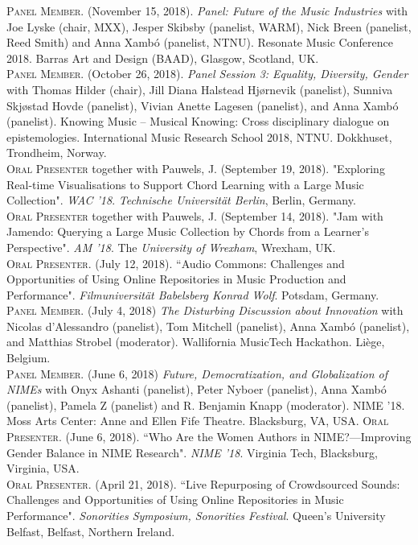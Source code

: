 \documentclass[10pt, a4paper]{article}
\newcommand{\years}[1]{\marginnote{\scriptsize #1}}
\begin{document}
{\years{2018i}\textsc{Panel Member}. (November 15, 2018). \emph{Panel: Future of the Music Industries} with Joe Lyske (chair, MXX), Jesper Skibsby (panelist, WARM), Nick Breen (panelist, Reed Smith) and Anna Xambó (panelist, NTNU). Resonate Music Conference 2018. Barras Art and Design (BAAD), Glasgow, Scotland, UK.\\
\years{2018h}\textsc{Panel Member}. (October 26, 2018). \emph{Panel Session 3: Equality, Diversity, Gender} with Thomas Hilder (chair), Jill Diana Halstead Hjørnevik (panelist), Sunniva Skjøstad Hovde (panelist), Vivian Anette Lagesen (panelist), and Anna Xambó (panelist). Knowing Music -- Musical Knowing: Cross disciplinary dialogue on epistemologies. International Music Research School 2018, NTNU. Dokkhuset, Trondheim, Norway.\\
\years{2018g} \textsc{Oral Presenter} together with Pauwels, J.  (September 19, 2018). "Exploring Real-time Visualisations to Support Chord Learning with a Large Music Collection". \emph{WAC '18}. \emph{Technische Universität Berlin}, Berlin, Germany.\\
\years{2018f} \textsc{Oral Presenter} together with Pauwels, J. (September 14, 2018). "Jam with Jamendo: Querying a Large Music Collection by Chords from a Learner’s Perspective". \emph{AM '18}. The \emph{University of Wrexham}, Wrexham, UK.\\
\years{2018e} \textsc{Oral Presenter}. (July 12, 2018). “Audio Commons: Challenges and Opportunities of Using Online Repositories in Music Production and Performance". \emph{Filmuniversität Babelsberg Konrad Wolf}. Potsdam, Germany.\\
\years{2018d}\textsc{Panel Member}. (July 4, 2018) \emph{The Disturbing Discussion about Innovation} with Nicolas d'Alessandro (panelist), Tom Mitchell (panelist), Anna Xambó (panelist), and Matthias Strobel (moderator). Wallifornia MusicTech Hackathon. Liège, Belgium.\\
\years{2018c}\textsc{Panel Member}. (June 6, 2018) \emph{Future, Democratization, and Globalization of NIMEs} with Onyx Ashanti (panelist), Peter Nyboer (panelist), Anna Xambó (panelist), Pamela Z (panelist) and R. Benjamin Knapp (moderator). NIME '18. Moss Arts Center: Anne and Ellen Fife Theatre. Blacksburg, VA, USA.
\years{2018b} \textsc{Oral Presenter}. (June 6, 2018). “Who Are the Women Authors in NIME?---Improving Gender Balance in NIME Research". \emph{NIME '18}. Virginia Tech, Blacksburg, Virginia, USA.\\
\years{2018a} \textsc{Oral Presenter}. (April 21, 2018). “Live Repurposing of Crowdsourced Sounds: Challenges and Opportunities of Using Online Repositories in Music Performance". \emph{Sonorities Symposium, Sonorities Festival}. Queen's University Belfast, Belfast, Northern Ireland.\\
}
\end{document}
